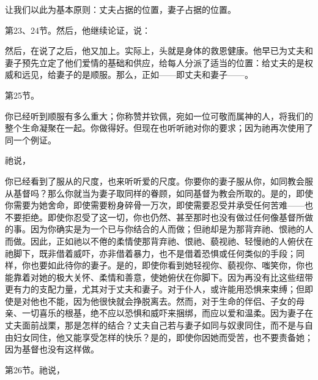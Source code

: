 让我们以此为基本原则：丈夫占据的位置，妻子占据的位置。\par

第23、24节。然后，他继续论证，说：\par

然后，在说了之后，他又加上。实际上，头就是身体的救恩健康。他早已为丈夫和妻子预先立定了他们爱情的基础和供应，给每人分派了适当的位置：给丈夫的是权威和远见，给妻子的是顺服。那么，正如——即丈夫和妻子——。\par

第25节。\par

你已经听到顺服有多么重大；你称赞并钦佩，宛如一位可敬而属神的人，将我们的整个生命凝聚在一起。你做得好。但现在也听听祂对你的要求；因为祂再次使用了同一个例证。\par

祂说，\par

你已经看到了服从的尺度，也来听听爱的尺度。你要你的妻子服从你，如同教会服从基督吗？那么你就当为妻子取同样的眷顾，如同基督为教会所取的。是的，即使你需要为她舍命，即使需要粉身碎骨一万次，即使需要忍受并承受任何苦难——也不要拒绝。即使你忍受了这一切，你也仍然、甚至那时也没有做过任何像基督所做的事。因为你确实是为一个已与你结合的人而做；但祂却是为那背弃祂、恨祂的人而做。因此，正如祂以不倦的柔情使那背弃祂、恨祂、藐视祂、轻慢祂的人俯伏在祂脚下，既非借着威吓，亦非借着暴力，也不是借着恐惧或任何类似的手段；同样，你也要如此待你的妻子。是的，即使你看到她轻视你、藐视你、嗤笑你，你也能靠着对她的极大关怀、柔情和善意，使她俯伏在你脚下。因为再没有比这些纽带更有力的支配力量，尤其对于丈夫和妻子。对于仆人，或许能用恐惧来束缚；但即使是对他也不能，因为他很快就会挣脱离去。然而，对于生命的伴侣、子女的母亲、一切喜乐的根基，绝不应以恐惧和威吓来捆绑，而应以爱和温柔。因为妻子在丈夫面前战栗，那是怎样的结合？丈夫自己若与妻子如同与奴隶同住，而不是与自由妇女同住，他又能享受怎样的快乐？是的，即使你因她而受苦，也不要责备她；因为基督也没有这样做。\par

第26节。祂说，\par

